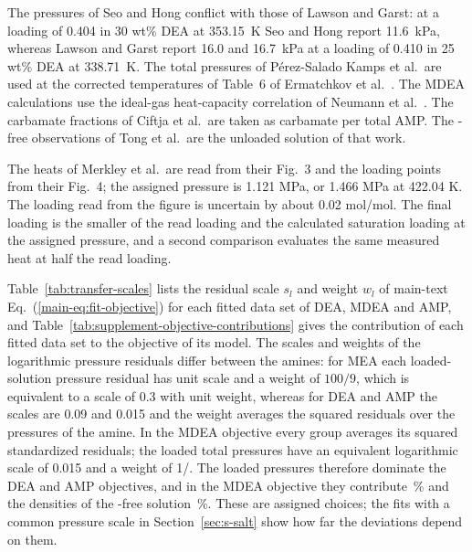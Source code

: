 \documentclass[a4paper,11pt]{article}
\begin{document}
The pressures of Seo and Hong conflict with those of Lawson and Garst: at a loading of 0.404 in 30 wt\% DEA at \SI{353.15}{\kelvin} Seo and Hong report \SI{11.6}{\kilo\pascal}, whereas Lawson and Garst report 16.0 and \SI{16.7}{\kilo\pascal} at a loading of 0.410 in 25 wt\% DEA at \SI{338.71}{\kelvin}.
The total pressures of P\'erez-Salado Kamps et al.\ are used at the corrected temperatures of Table~6 of Ermatchkov et al.\ \cite{ermatchkovSolubilityCarbonDioxide2006}.
The MDEA calculations use the ideal-gas heat-capacity correlation of Neumann et al.\ \cite{neumannThermodynamicPropertiesMethyl2022}.
The carbamate fractions of Ciftja et al.\ are taken as carbamate per total AMP.
The \COtwo-free observations of Tong et al.\ are the unloaded solution of that work.



The heats of Merkley et al.\ are read from their Fig.~3 and the loading points from their Fig.~4; the assigned pressure is 1.121 MPa, or 1.466 MPa at 422.04 K.
The loading read from the figure is uncertain by about 0.02 mol/mol.
The final loading is the smaller of the read loading and the calculated saturation loading at the assigned pressure, and a second comparison evaluates the same measured heat at half the read loading.

Table~\ref{tab:transfer-scales} lists the residual scale $s_l$ and weight $w_l$ of main-text Eq.~(\ref{main-eq:fit-objective}) for each fitted data set of DEA, MDEA and AMP, and Table~\ref{tab:supplement-objective-contributions} gives the contribution of each fitted data set to the objective of its model.
The scales and weights of the logarithmic pressure residuals differ between the amines: for MEA each loaded-solution pressure residual has unit scale and a weight of $100/9$, which is equivalent to a scale of 0.3 with unit weight, whereas for DEA and AMP the scales are 0.09 and 0.015 and the weight averages the squared residuals over the pressures of the amine.
In the MDEA objective every group averages its squared standardized residuals; the loaded total pressures have an equivalent logarithmic scale of 0.015 and a weight of 1/.
The loaded pressures therefore dominate the DEA and AMP objectives, and in the MDEA objective they contribute \,\% and the  densities of the \COtwo-free solution \,\%.
These are assigned choices; the fits with a common pressure scale in Section~\ref{sec:s-salt} show how far the deviations depend on them.
\end{document}
